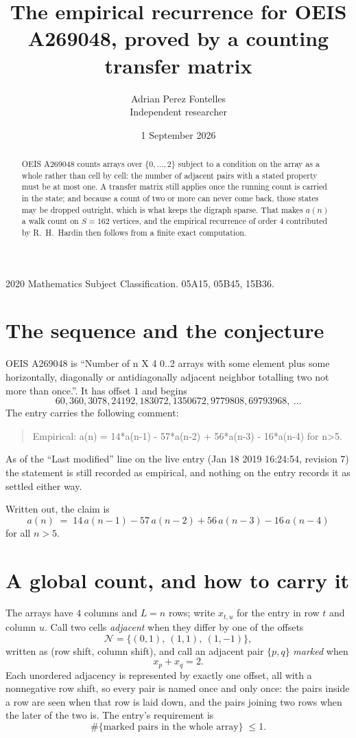 \documentclass[11pt,a4paper]{article}
\title{The empirical recurrence for OEIS A269048, proved by a counting transfer matrix}
\author{Adrian Perez Fontelles\\ \small Independent researcher}
\date{1 September 2026}
\theoremstyle{plain}
\theoremstyle{definition}
\begin{document}
\maketitle

\begin{abstract}
OEIS A269048 counts arrays over $\{0,\dots,2\}$ subject to a condition on the array as a
whole rather than cell by cell: the number of adjacent pairs with a stated property must be
at most one. A transfer matrix still applies once the running count is carried in the state; and
because a count of two or more can never come back, those states may be dropped outright,
which is what keeps the digraph sparse. That makes $a(n)$ a walk count on $S=162$ vertices,
and the empirical recurrence of order $4$ contributed by R.~H.~Hardin then follows from
a finite exact computation.
\end{abstract}

\noindent\small 2020 Mathematics Subject Classification. 05A15, 05B45, 15B36.\normalsize

\section{The sequence and the conjecture}

OEIS A269048 is ``Number of n X 4 0..2 arrays with some element plus some horizontally, diagonally or antidiagonally adjacent neighbor totalling two not more than once.''. It has offset $1$ and begins
\[
60, 360, 3078, 24192, 183072, 1350672, 9779808, 69793968,\ \dots
\]
The entry carries the following comment:
\begin{quote}\small
Empirical: a(n) = 14*a(n-1) - 57*a(n-2) + 56*a(n-3) - 16*a(n-4) for n>5.
\end{quote}
As of the ``Last modified'' line on the live entry (Jan 18 2019 16:24:54, revision 7) the statement is
still recorded as empirical, and nothing on the entry records it as settled either way.

Written out, the claim is
\begin{equation}\label{eq:conj}
a(n)\;=\;14\,a(n-1) - 57\,a(n-2) + 56\,a(n-3) - 16\,a(n-4)
\end{equation}
for all $n>5$.

\section{A global count, and how to carry it}

The arrays have $4$ columns and $L=n$ rows; write $x_{t,u}$ for the entry in
row $t$ and column $u$. Call two cells \emph{adjacent} when they differ by one of the
offsets
\[
\mathcal N=\{(0,1),\ (1,1),\ (1,-1)\},
\]
written as (row shift, column shift), and call an adjacent pair $\{p,q\}$
\emph{marked} when
\[
x_{p}+x_{q}=2 .
\]
Each unordered adjacency is represented by exactly one offset, all with a nonnegative row
shift, so every pair is named once and only once: the pairs inside a row are seen when
that row is laid down, and the pairs joining two rows when the later of the two is. The
entry's requirement is
\begin{equation}\label{eq:glob}
\#\{\text{marked pairs in the whole array}\}\;\le1.
\end{equation}
\end{document}
